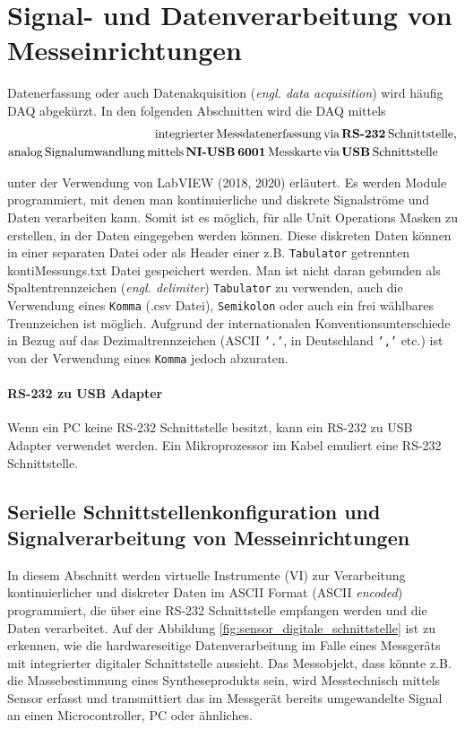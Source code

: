 \section{Signal- und Datenverarbeitung von Mess\-einrichtungen}

Datenerfassung oder auch Datenakquisition (\textit{engl. data acquisition}) wird häufig DAQ abgekürzt. In den folgenden Abschnitten wird die DAQ mittels
\begin{align*}
\mathrm{integrierter\,Messdatenerfassung\,}  &\textrm{via}\, \textbf{RS-232\,} \mathrm{Schnittstelle}, \\
\mathrm{analog\,Signalumwandlung\,mittels\,} \textbf{NI-USB\,6001\,} \mathrm{Messkarte\,} &\textrm{via}\, \textbf{USB\,}\mathrm{Schnittstelle}
\end{align*} 

unter der Verwendung von LabVIEW (2018, 2020) erläutert. Es werden Module programmiert, mit denen man kontinuierliche und diskrete Signalströme und Daten verarbeiten kann. Somit ist es möglich, für alle Unit Operations Masken zu erstellen, in der Daten eingegeben werden können. Diese diskreten Daten  können in einer separaten Datei oder als Header einer z.B. \texttt{Tabulator} getrennten \glqq kontiMessungs.txt\grqq{} Datei gespeichert werden. Man ist nicht daran gebunden als Spaltentrennzeichen (\textit{engl. delimiter}) \texttt{Tabulator} zu verwenden, auch die Verwendung eines \texttt{Komma} (.csv Datei), \texttt{Semikolon} oder auch ein frei wählbares Trennzeichen ist möglich. Aufgrund der internationalen Konventionsunterschiede in Bezug auf das Dezimaltrennzeichen (ASCII \texttt{'.'}, in Deutschland \texttt{','} etc.)  ist von der Verwendung eines \texttt{Komma} jedoch abzuraten.

\paragraph{RS-232 zu USB Adapter} Wenn ein PC keine RS-232 Schnittstelle besitzt, kann ein RS-232 zu USB Adapter verwendet werden. Ein Mikroprozessor im Kabel emuliert eine RS-232 Schnittstelle. \\

\subsection{Serielle Schnittstellenkonfiguration und Signalverarbeitung von Messeinrichtungen}

In diesem Abschnitt werden virtuelle Instrumente (VI) zur Verarbeitung kontinuierlicher und diskreter Daten im ASCII Format (ASCII \textit{encoded}) programmiert, die über eine RS-232 Schnittstelle empfangen werden und die Daten verarbeitet. Auf der Abbildung \ref{fig:sensor_digitale_schnittstelle} ist zu erkennen, wie die hardwareseitige Datenverarbeitung im Falle eines Messgeräts mit integrierter digitaler Schnittstelle aussieht. Das Messobjekt, dass könnte z.B. die Massebestimmung eines Syntheseprodukts sein, wird Messtechnisch mittels Sensor erfasst und transmittiert das im Messgerät bereits umgewandelte Signal an einen Microcontroller, PC oder ähnliches.

